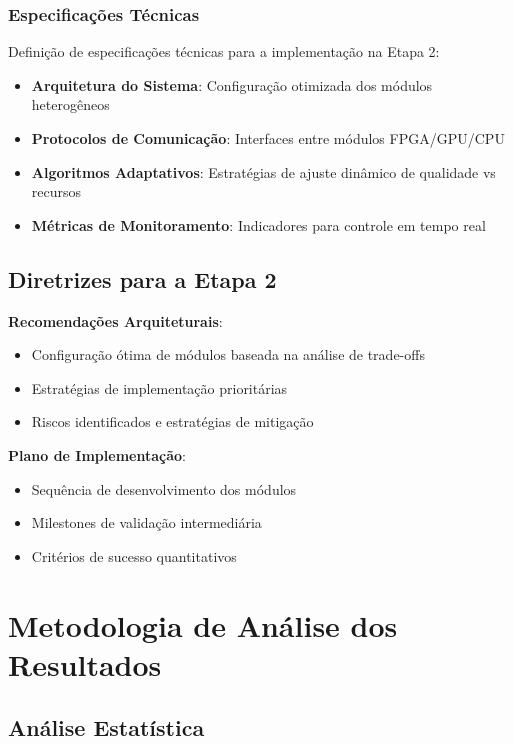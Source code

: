 \subsubsection{Especificações Técnicas}

Definição de especificações técnicas para a implementação na Etapa 2:
\begin{itemize}
\item \textbf{Arquitetura do Sistema}: Configuração otimizada dos módulos heterogêneos
\item \textbf{Protocolos de Comunicação}: Interfaces entre módulos FPGA/GPU/CPU
\item \textbf{Algoritmos Adaptativos}: Estratégias de ajuste dinâmico de qualidade vs recursos
\item \textbf{Métricas de Monitoramento}: Indicadores para controle em tempo real
\end{itemize}

\subsection{Diretrizes para a Etapa 2}

\textbf{Recomendações Arquiteturais}:
\begin{itemize}
\item Configuração ótima de módulos baseada na análise de trade-offs
\item Estratégias de implementação prioritárias
\item Riscos identificados e estratégias de mitigação
\end{itemize}

\textbf{Plano de Implementação}:
\begin{itemize}
\item Sequência de desenvolvimento dos módulos
\item Milestones de validação intermediária
\item Critérios de sucesso quantitativos
\end{itemize}

\section{Metodologia de Análise dos Resultados}

\subsection{Análise Estatística}

